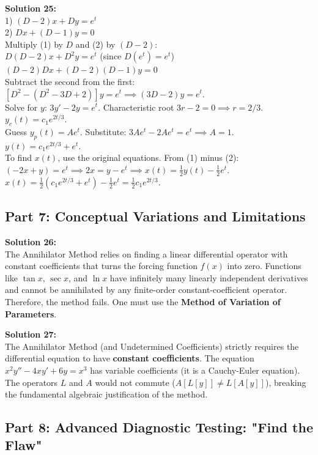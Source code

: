 \documentclass[11pt]{article}
\begin{document}
\textbf{Solution 25:} \\
1) $(D-2)x + Dy = e^t$ \\
2) $Dx + (D-1)y = 0$ \\
Multiply (1) by $D$ and (2) by $(D-2)$: \\
$D(D-2)x + D^2y = e^t$ (since $D(e^t) = e^t$) \\
$(D-2)Dx + (D-2)(D-1)y = 0$ \\
Subtract the second from the first: \\
$[D^2 - (D^2 - 3D + 2)]y = e^t \implies (3D - 2)y = e^t$. \\
Solve for $y$: $3y' - 2y = e^t$. Characteristic root $3r - 2 = 0 \implies r = 2/3$. $y_c(t) = c_1 e^{2t/3}$. \\
Guess $y_p(t) = A e^t$. Substitute: $3A e^t - 2A e^t = e^t \implies A = 1$. \\
$y(t) = c_1 e^{2t/3} + e^t$. \\
To find $x(t)$, use the original equations. From (1) minus (2): \\
$(-2x + y) = e^t \implies 2x = y - e^t \implies x(t) = \frac{1}{2}y(t) - \frac{1}{2}e^t$. \\
$x(t) = \frac{1}{2}(c_1 e^{2t/3} + e^t) - \frac{1}{2}e^t = \frac{1}{2}c_1 e^{2t/3}$.

\subsection*{Part 7: Conceptual Variations and Limitations}

\textbf{Solution 26:} \\
The Annihilator Method relies on finding a linear differential operator with constant coefficients that turns the forcing function $f(x)$ into zero. Functions like $\tan x$, $\sec x$, and $\ln x$ have infinitely many linearly independent derivatives and cannot be annihilated by any finite-order constant-coefficient operator. Therefore, the method fails. One must use the \textbf{Method of Variation of Parameters}.

\textbf{Solution 27:} \\
The Annihilator Method (and Undetermined Coefficients) strictly requires the differential equation to have \textbf{constant coefficients}. The equation $x^2 y'' - 4x y' + 6y = x^3$ has variable coefficients (it is a Cauchy-Euler equation). The operators $L$ and $A$ would not commute ($A[L[y]] \neq L[A[y]]$), breaking the fundamental algebraic justification of the method.

\subsection*{Part 8: Advanced Diagnostic Testing: "Find the Flaw"}
\end{document}
